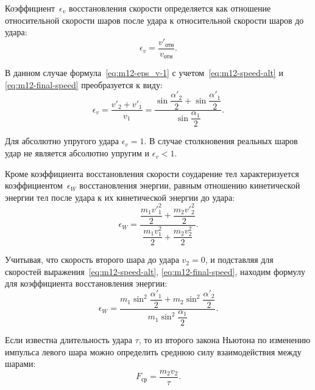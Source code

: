 \documentclass[a4paper, 12pt]{extarticle}
\newcommand{\eps}{\epsilon}
\begin{document}
Коэффициент~$\eps_v$ восстановления скорости определяется как отношение относительной скорости шаров после удара к относительной скорости шаров до удара:
\begin{equation}
\label{eq:m12-eps_v-1}
\eps_v = \frac{v'_\text{отн}}{v_\text{отн}}.
\end{equation}

В данном случае формула~\eqref{eq:m12-eps_v-1} с учетом~\eqref{eq:m12-speed-alt} и \eqref{eq:m12-final-speed} преобразуется к виду: %
\begin{equation}
\label{eq:m12-eps_v-2}
\eps_v = \frac{v'_2 + v'_1}{v_1} = \frac{\sin \dfrac{\alpha'_2}{2} + \sin \dfrac{\alpha'_1}{2}}{\sin \dfrac{\alpha_1}{2}}.
\end{equation}

Для абсолютно упругого удара $\eps_v = 1$. В случае столкновения реальных шаров удар не является абсолютно упругим и $\eps_v < 1$.

Кроме коэффициента восстановления скорости соударение тел характеризуется коэффициентом~$\eps_W$ восстановления энергии, равным отношению кинетической энергии тел после удара к их кинетической энергии до удара:
\begin{equation}
\label{eq:m12-eps_W-1}
\eps_W = \frac{\dfrac{m_1 v'^2_1}{2} + \dfrac{m_2 v'^2_2}{2}}{\dfrac{m_1 v^2_1}{2} + \dfrac{m_2 v^2_2}{2}}.
\end{equation} %

Учитывая, что скорость второго шара до удара $v_2 = 0$, и подставляя для скоростей выражения~\eqref{eq:m12-speed-alt}, \eqref{eq:m12-final-speed}, находим формулу для коэффициента восстановления энергии: %
\begin{equation}
\label{eq:m12-eps_W-2}
\eps_W = \frac{m_1 \sin^2 \dfrac{\alpha'_1}{2} + m_2 \sin^2 \dfrac{\alpha'_2}{2}}{m_1 \sin^2 \dfrac{\alpha_1}{2}}.
\end{equation}

Если известна длительность удара $\tau$, то из второго закона Ньютона по изменению импульса левого шара можно определить среднюю силу взаимодействия между шарами:
\begin{equation}
\label{eq:m12-2nd-newton's-law}
F_\text{ср} = \frac{m_2 v_2}{\tau}.
\end{equation}
\end{document}
